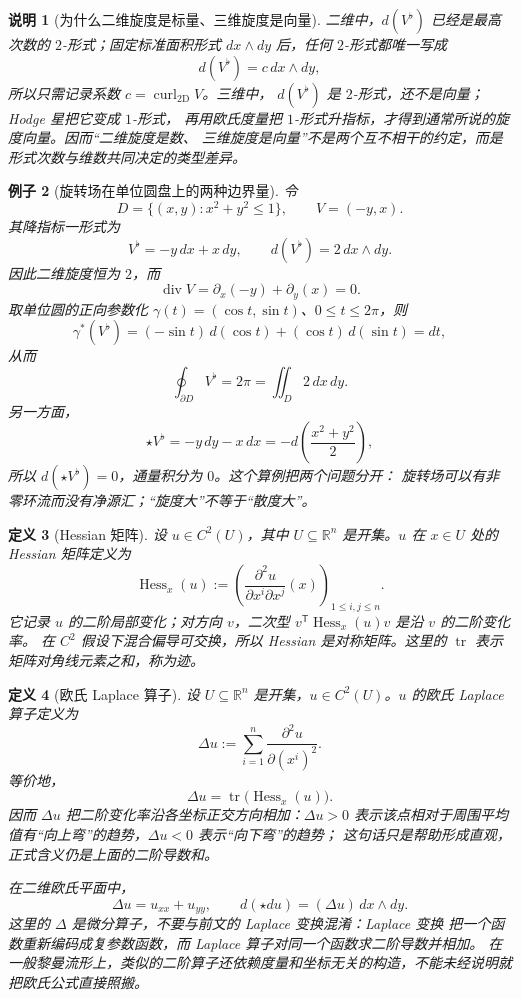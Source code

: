 \documentclass[UTF8,fontset=none,a4paper,11pt]{ctexart}
\theoremstyle{foundation-definition}
\newtheorem{definition}{定义}[section]
\theoremstyle{foundation-theorem}
\theoremstyle{foundation-proposition}
\theoremstyle{foundation-example}
\newtheorem{example}[definition]{例子}
\theoremstyle{foundation-remark}
\newtheorem{remark}[definition]{说明}
\theoremstyle{foundation-theorem}
\begin{document}
\begin{remark}[为什么二维旋度是标量、三维旋度是向量]
二维中，\(d(V^\flat)\) 已经是最高次数的 \(2\)-形式；固定标准面积形式
\(dx\wedge dy\) 后，任何 \(2\)-形式都唯一写成
\[
d(V^\flat)=c\,dx\wedge dy,
\]
所以只需记录系数 \(c=\operatorname{curl}_{2\mathrm D}V\)。三维中，
\(d(V^\flat)\) 是 \(2\)-形式，还不是向量；Hodge 星把它变成 \(1\)-形式，
再用欧氏度量把 \(1\)-形式升指标，才得到通常所说的旋度向量。因而“二维旋度是数、
三维旋度是向量”不是两个互不相干的约定，而是形式次数与维数共同决定的类型差异。
\end{remark}

\begin{example}[旋转场在单位圆盘上的两种边界量]
令
\[
D=\{(x,y):x^2+y^2\leq1\},\qquad V=(-y,x).
\]
其降指标一形式为
\[
V^\flat=-y\,dx+x\,dy,\qquad
d(V^\flat)=2\,dx\wedge dy.
\]
因此二维旋度恒为 \(2\)，而
\[
\operatorname{div}V=\partial_x(-y)+\partial_y(x)=0.
\]
取单位圆的正向参数化
\(\gamma(t)=(\cos t,\sin t)\)、\(0\leq t\leq2\pi\)，则
\[
\gamma^*(V^\flat)
=(-\sin t)\,d(\cos t)+(\cos t)\,d(\sin t)
=dt,
\]
从而
\[
\oint_{\partial D}V^\flat=2\pi
=\iint_D2\,dx\,dy.
\]
另一方面，
\[
\star V^\flat=-y\,dy-x\,dx
= -d\!\left(\frac{x^2+y^2}{2}\right),
\]
所以 \(d(\star V^\flat)=0\)，通量积分为 \(0\)。这个算例把两个问题分开：
旋转场可以有非零环流而没有净源汇；“旋度大”不等于“散度大”。
\end{example}

\begin{definition}[Hessian 矩阵]\label{def:hessian}
设 \(u\in C^2(U)\)，其中 \(U\subseteq\mathbb R^n\) 是开集。\(u\) 在 \(x\in U\)
处的 Hessian 矩阵定义为
\[
  \operatorname{Hess}_x(u)
  :=\left(\frac{\partial^2u}{\partial x^i\partial x^j}(x)\right)_{1\leq i,j\leq n}.
\]
它记录 \(u\) 的二阶局部变化；对方向 \(v\)，二次型
\(v^{\mathsf T}\operatorname{Hess}_x(u)v\) 是沿 \(v\) 的二阶变化率。
在 \(C^2\) 假设下混合偏导可交换，所以 Hessian 是对称矩阵。这里的
\(\operatorname{tr}\) 表示矩阵对角线元素之和，称为迹。
\end{definition}

\begin{definition}[欧氏 Laplace 算子]\label{def:laplace-operator}
设 \(U\subseteq\mathbb R^n\) 是开集，\(u\in C^2(U)\)。\(u\) 的欧氏 Laplace
算子定义为
\[
\Delta u:=\sum_{i=1}^{n}\frac{\partial^2u}{\partial (x^i)^2}.
\]
等价地，
\[
\Delta u=\operatorname{tr}\bigl(\operatorname{Hess}_x(u)\bigr).
\]
因而 \(\Delta u\) 把二阶变化率沿各坐标正交方向相加：\(\Delta u>0\)
表示该点相对于周围平均值有“向上弯”的趋势，\(\Delta u<0\) 表示“向下弯”的趋势；
这句话只是帮助形成直观，正式含义仍是上面的二阶导数和。

在二维欧氏平面中，
\[
\Delta u=u_{xx}+u_{yy},
\qquad
d(\star du)=(\Delta u)\,dx\wedge dy.
\]
这里的 \(\Delta\) 是微分算子，不要与前文的 Laplace 变换混淆：Laplace 变换
把一个函数重新编码成复参数函数，而 Laplace 算子对同一个函数求二阶导数并相加。
在一般黎曼流形上，类似的二阶算子还依赖度量和坐标无关的构造，不能未经说明就
把欧氏公式直接照搬。
\end{definition}
\end{document}
